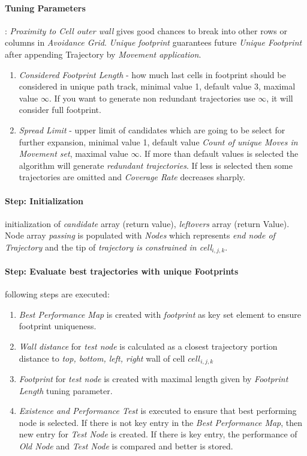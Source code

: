 \paragraph{Tuning Parameters}: \emph{Proximity to Cell outer wall} gives good chances to break into other rows or columns in \emph{Avoidance Grid}. \emph{Unique footprint} guarantees future \emph{Unique Footprint} after appending Trajectory by \emph{Movement application}. 
\begin{enumerate}
    \item \emph{Considered Footprint Length} - how much last cells in footprint should be considered in unique path track, minimal value 1, default value 3, maximal value $\infty$. If you want to generate non redundant trajectories use $\infty$, it will consider full footprint.
    
    \item \emph{Spread Limit} - upper limit of candidates which are going to be select for further expansion, minimal value 1, default value \emph{Count of unique Moves in Movement set}, maximal value $\infty$. If more than default values is selected the algorithm will generate \emph{redundant trajectories}. If less is selected then some trajectories are omitted and \emph{Coverage Rate} decreases sharply. 
\end{enumerate}

\paragraph{Step: Initialization} initialization of \emph{candidate} array (return value), \emph{leftovers} array (return Value). Node array \emph{passing} is populated with \emph{Nodes} which represents \emph{end node of Trajectory} and the tip of \emph{trajectory is constrained in \emph{cell}$_{i,j,k}$}.

\paragraph{Step: Evaluate best trajectories with unique Footprints} following steps are executed:
\begin{enumerate}
    \item \emph{Best Performance Map} is created with \emph{footprint} as key set element to ensure footprint uniqueness.
    \item \emph{Wall distance} for \emph{test node} is calculated as a closest trajectory portion distance to \emph{top, bottom, left, right} wall of cell $cell_{i,j,k}$
    \item \emph{Footprint} for \emph{test node} is created with maximal length given by \emph{Footprint Length} tuning parameter.
    \item \emph{Existence and Performance Test} is executed to ensure that best performing node is selected. If there is not key entry in the \emph{Best Performance Map}, then new entry for \emph{Test Node} is created. If there is key entry, the performance of \emph{Old Node} and \emph{Test Node} is compared and better is stored.
\end{enumerate}


